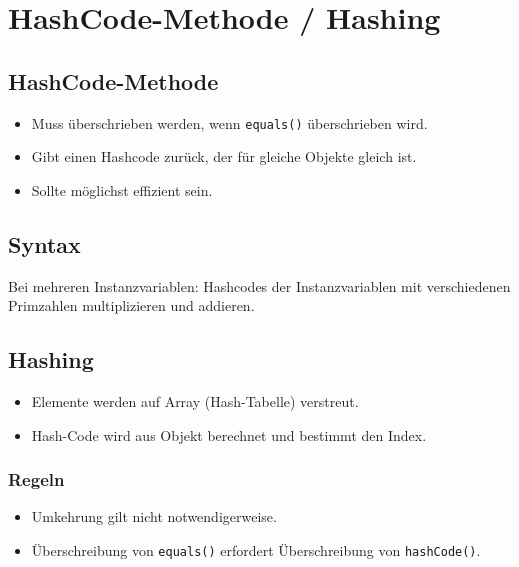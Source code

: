 \section{HashCode-Methode / Hashing}
\subsection{HashCode-Methode}
\begin{itemize}
    \item Muss überschrieben werden, wenn \lstinline{equals()} überschrieben wird.
    \item Gibt einen Hashcode zurück, der für gleiche Objekte gleich ist.
    \item Sollte möglichst effizient sein.
\end{itemize}

\subsection{Syntax}


Bei mehreren Instanzvariablen: Hashcodes der Instanzvariablen mit verschiedenen Primzahlen multiplizieren und addieren.

\subsection{Hashing}
\begin{itemize}
    \item Elemente werden auf Array (Hash-Tabelle) verstreut.
    \item Hash-Code wird aus Objekt berechnet und bestimmt den Index.
\end{itemize}

\subsubsection{Regeln}
\textrightarrow{}
\begin{itemize}
    \item Umkehrung gilt nicht notwendigerweise.
    \item Überschreibung von \lstinline{equals()} erfordert Überschreibung von \lstinline{hashCode()}.
\end{itemize}

